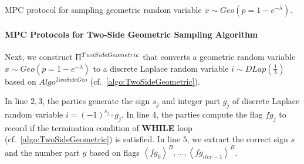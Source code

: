 \begin{protocol}[tbh!]
{{            \\
            \\
            }}
            \caption{MPC protocol for sampling geometric random variable $x \sim Geo\left(p=1-e^{-\lambda}\right) $.}
            \label{prot:GeometricExpBinarySearch}
      \end{protocol}
      \FloatBarrier

      \paragraph{MPC Protocols for Two-Side Geometric Sampling Algorithm}
      \label{para:MPCProtocolsforTwo-SideGeometricSamplingAlgorithm}

      Next, we construct $\Uppi^{TwoSideGeometric}$ that converts a geometric random variable $x\sim Geo\left(p=1-e^{-\lambda}\right)$ to a discrete Laplace random variable $i\sim DLap\left(\frac{1}{\lambda}\right) $ based on $Algo^{TwoSideGeo}$ (cf.~\autoref{algo:TwoSideGeometric}).

      In line $2,3$, the parties generate the sign $s_j$ and integer part $g_j$ of discrete Laplace random variable $i=\left(-1\right) ^{s_j}\cdot g_j$.
      In line $4$, the parties compute the flag $fg_j$ to record if the termination condition of \textbf{WHILE} loop (cf.~\autoref{algo:TwoSideGeometric}) is satisfied.
      In line $5$, we extract the correct sign $s$ and the number part $g$ based on flags $\left\langle fg_0\right\rangle ^B,\ldots ,\left\langle fg_{iter-1}\right\rangle ^B$.


